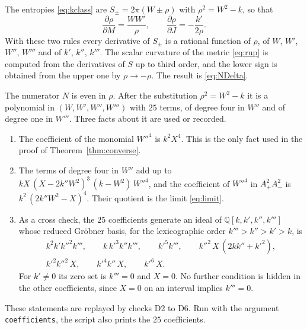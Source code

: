 \documentclass[11pt]{article}
\theoremstyle{definition}
\theoremstyle{remark}
\begin{document}
The entropies \eqref{eq:kclass} are $S_{\pm}=2\pi(W\pm\rho)$ with $\rho^{2}=W^{2}-k$, so that
\[
\frac{\partial\rho}{\partial M}=\frac{WW'}{\rho},\qquad \frac{\partial\rho}{\partial J}=-\frac{k'}{2\rho} .
\]
With these two rules every derivative of $S_{\pm}$ is a rational function of $\rho$, of $W$, $W'$, $W''$, $W'''$ and of $k'$, $k''$, $k'''$. The scalar curvature of the metric \eqref{eq:rup} is computed from the derivatives of $S$ up to third order, and the lower sign is obtained from the upper one by $\rho\to-\rho$. The result is \eqref{eq:NDelta}.

The numerator $N$ is even in $\rho$. After the substitution $\rho^{2}=W^{2}-k$ it is a polynomial in $(W,W',W'',W''')$ with $25$ terms, of degree four in $W''$ and of degree one in $W'''$. Three facts about it are used or recorded.
\begin{enumerate}
\item The coefficient of the monomial $W''^{4}$ is $k^{2}X^{4}$. This is the only fact used in the proof of Theorem~\ref{thm:converse}.
\item The terms of degree four in $W''$ add up to $kX\,(X-2k''W^{2})^{3}\,(k-W^{2})\,W''^{4}$, and the coefficient of $W''^{4}$ in $A_{+}^{2}A_{-}^{2}$ is $k^{2}\,(2k''W^{2}-X)^{4}$. Their quotient is the limit \eqref{eq:limit}.
\item As a cross check, the $25$ coefficients generate an ideal of $\mathbb{Q}[k,k',k'',k''']$ whose reduced Gr\"obner basis, for the lexicographic order $k'''>k''>k'>k$, is
\begin{gather*}
k^{2}k'k''^{2}k''',\qquad k\,k'^{3}k''k''',\qquad k'^{5}k''',\qquad k''^{2}\,X\,(2kk''+k'^{2}),\\
k'^{2}k''^{2}\,X,\qquad k'^{4}k''\,X,\qquad k'^{6}\,X .
\end{gather*}
For $k'\neq0$ its zero set is $k'''=0$ and $X=0$. No further condition is hidden in the other coefficients, since $X=0$ on an interval implies $k'''=0$.
\end{enumerate}
These statements are replayed by checks D2 to D6. Run with the argument \texttt{coefficients}, the script also prints the $25$ coefficients.
\end{document}

